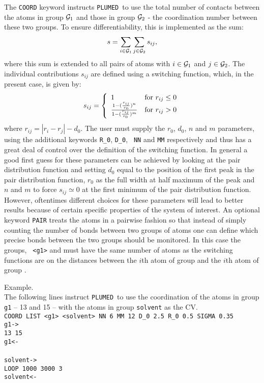 \documentclass[12pt,fleqn]{report}
\newcommand{\plumed}{{\tt PLUMED}}
\newcommand{\esempio}[1]{
\vspace{10pt}
\begin{flushright}
\colorbox{light-gray}{
   \begin{minipage}{13cm}
       \scriptsize{
{\fontfamily{phv} \fontseries{b}
 \selectfont Example. \\
 \fontseries{m} \selectfont #1 } }
\end{minipage}}
\end{flushright}
\vspace{20pt}
}
\begin{document}
The {\tt COORD} keyword instructs \plumed\ to use the total number of 
contacts between the atoms in group ${\cal G}_1$ and those in group ${\cal G}_2$ 
- the coordination number between these two groups.   To
ensure differentiability, this is implemented as the sum: $$s = \sum_{i\in {\cal
G}_1} \sum_{j\in {\cal G}_2} s_{ij},$$ where this sum is extended to all pairs of
atoms with $i\in {\cal G}_1$ and $j\in {\cal G}_2$.  The individual
contributions $s_{ij}$ are defined using a switching function, which, in the present
case, is given by:
$$ s_{ij} = \left \{
\begin{array}{ll}
 1 & {\rm for}~ r_{ij} \leq 0\\
 \frac{1-(\frac{r_{ij}}{r_0})^n}{1-(\frac{r_{ij}}{r_0})^m} & {\rm for}~ r_{ij} > 0\\
\end{array} \right. $$
where $r_{ij} = |r_i - r_j| - d_0$.  The user must supply the $r_0$, $d_0$, $n$
and $m$ parameters, using the additional keywords {\tt R\_0}, {\tt D\_0}, {\tt
NN} and {\tt MM} respectively and thus has a great deal of control over the definition
of the switching function.  In general a good first guess for these parameters can be 
achieved by looking at the pair distribution function and setting $d_0$ 
equal to the position of the first peak in the pair distribution function,
$r_0$ as the full width at half maximum of the peak and $n$ and $m$ to force
$s_{ij}\simeq0$ at the first minimum of the pair distribution function. However, 
oftentimes different choices for these parameters will lead to better results 
because of certain specific properties of the system of interest.
An optional keyword {\tt PAIR} treats the atoms in a pairwise fashion so that 
instead of simply counting the number of bonds between two groups of atoms one can define
which precise bonds between the two groups should be monitored.  In this case the groups, {\tt
<g1>} and {\tt <g2>} must have the same number of atoms as the switching functions are on the  
distances between the $i$th atom of group {\tt <g1>} and the $i$th atom of group {\tt <g2>}.

\esempio{The following lines instruct \plumed\ to use the coordination 
of the atoms in group {\tt g1} -- 13 and 15 -- 
with the atoms in group {\tt solvent} as the CV.  \vspace{10pt} \\
{\tt COORD LIST <g1> <solvent> NN 6 MM 12 D\_0 2.5 R\_0 0.5 SIGMA 0.35  \\ 
g1->  \\ 
13 15  \\ 
g1<-  \\ 
 \\ 
solvent-> \\ 
LOOP 1000 3000 3 \\ 
solvent<-} 
}
\end{document}
